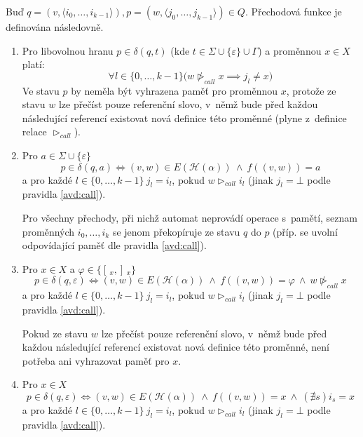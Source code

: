 \documentclass[thesis=B,czech]{FITthesis}[2019/12/23]
\theoremstyle{definition}
\begin{document}
Buď $q=(v, \langle i_0, \dots, i_{k-1} \rangle), p=(w, \langle j_0, \dots, j_{k-1} \rangle) \in Q$. Přechodová funkce je definována následovně.
\begin{enumerate}
	\item{\label{avd:call} Pro libovolnou hranu $p \in \delta(q, t)$ (kde ${t \in \Sigma \cup \{\varepsilon\} \cup \Gamma}$) a proměnnou $x \in X$ platí:	\begin{equation}\forall l \in \{0, \dots, k-1\} \big( w \ntriangleright_{call} x \implies j_l \ne x) \end{equation}
	Ve stavu $p$ by neměla být vyhrazena paměť pro proměnnou $x$, protože ze stavu $w$ lze přečíst pouze referenční slovo, v~němž bude před každou následující referencí existovat nová definice této proměnné (plyne z~definice relace $\triangleright_{call}$).
		}
	\item\label{rule2}{Pro $a \in \Sigma\cup\{\varepsilon\}$ 
			\begin{equation}
			p \in \delta(q, a) \iff (v, w) \in E(\mathcal{H}(\alpha)) \ \wedge \ f((v, w))=a
			\end{equation} a pro každé $l \in \{0, \dots, k-1\} \  j_l = i_l$, pokud $w \triangleright_{call} i_l$ (jinak $j_l = \bot$ podle pravidla \ref{avd:call}).
			
		Pro všechny přechody, při nichž automat neprovádí operace s~pamětí, seznam proměnných $i_0, \dots, i_k$ se jenom překopíruje ze stavu $q$ do $p$ (příp. se uvolní odpovídající paměť dle pravidla \ref{avd:call}). } 
 
	\item{\label{rule3}Pro $x \in X$ a $\varphi \in \{[\,_x, ]\,_x\}$
	 \begin{equation} p \in \delta(q, \varepsilon) \iff (v, w) \in E(\mathcal{H}(\alpha)) \ \wedge \ f((v, w))=\varphi \ \wedge \  w \ntriangleright_{call} x
	\end{equation}  a 
			pro každé $l \in \{0, \dots, k-1\} \  j_l = i_l$, pokud $w \triangleright_{call} i_l$ (jinak $j_l = \bot$ podle pravidla \ref{avd:call}).

Pokud ze stavu $w$ lze přečíst pouze referenční slovo, v~němž bude před každou následující referencí existovat nová definice této proměnné, není potřeba ani vyhrazovat paměť pro $x$.}
	\item{Pro $x \in X$ 
		\begin{equation}p \in \delta(q, \varepsilon) \iff (v, w) \in E(\mathcal{H}(\alpha)) \ \wedge \ f((v, w))= x \ \wedge \ (\nexists s) i_s = x
		\end{equation} a 
			pro každé $l \in \{0, \dots, k-1\} \  j_l = i_l$, pokud $w \triangleright_{call} i_l$ (jinak $j_l = \bot$ podle pravidla \ref{avd:call}).
	
}
\end{enumerate}
\end{document}

